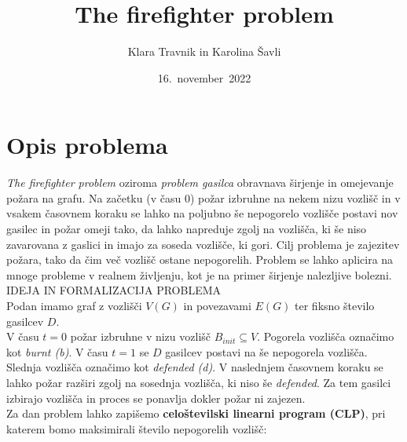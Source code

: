 \documentclass[a4paper, 11pt]{article}
\title{\textbf{\LARGE{The firefighter problem}}}
\author{Klara Travnik in Karolina Šavli}
\date{16.\ november\ 2022}
\begin{document}
\maketitle

\section{Opis problema}

\noindent \emph{The firefighter problem} oziroma \emph{problem gasilca} obravnava širjenje in omejevanje požara
na grafu. Na začetku (v času $0$) požar izbruhne na nekem nizu vozlišč in v vsakem časovnem
koraku se lahko na poljubno še nepogorelo vozlišče postavi nov gasilec in požar omeji tako, da lahko
napreduje zgolj na vozlišča, ki še niso zavarovana z gaslici in imajo za soseda vozlišče, ki gori.
Cilj problema je zajezitev požara, tako da čim več vozlišč ostane nepogorelih. 
Problem se lahko aplicira na mnoge probleme v realnem življenju, kot je 
na primer širjenje nalezljive bolezni. \\

\noindent IDEJA IN FORMALIZACIJA PROBLEMA \\
Podan imamo graf z vozlišči $V\left(G\right)$ in povezavami $E\left(G\right)$ ter 
fiksno število gasilcev $D$. \\
V času $t = 0$ požar izbruhne v nizu vozlišč $B_{init} \subseteq V$. Pogorela vozlišča
označimo kot \emph{burnt (b)}.
V času $t = 1$ se $D$ gasilcev postavi na še nepogorela vozlišča. Slednja vozlišča 
označimo kot \emph{defended (d)}.
V naslednjem časovnem koraku se lahko požar razširi zgolj na sosednja vozlišča, ki niso še \emph{defended}.
Za tem gasilci izbirajo vozlišča in proces se ponavlja dokler požar ni zajezen. \\
Za dan problem lahko zapišemo \textbf{celoštevilski linearni program (CLP)}, pri katerem
bomo maksimirali število nepogorelih vozlišč:
\end{document}
